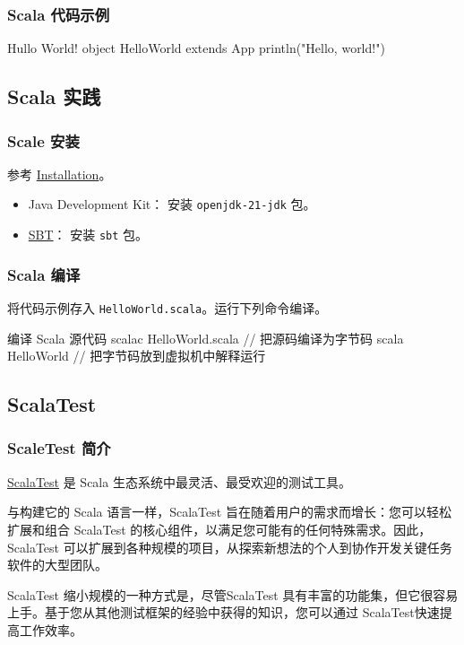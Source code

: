 \documentclass[xcolor=table,dvipsnames,svgnames,aspectratio=169]{ctexbeamer}
\begin{document}
\begin{frame}[fragile]
  \frametitle{Scala 代码示例}
  \begin{codeblock}[language=scala]{Hullo World!}
object HelloWorld extends App {
    println("Hello, world!")
  }
  \end{codeblock}
\end{frame}

\subsection{Scala 实践}

\begin{frame}
  \frametitle{Scale 安装}
  \label{scalainstall}
  参考 \href{https://www.chisel-lang.org/docs/installation}{Installation}。
  \begin{itemize}
    \item Java Development Kit： 安装 \lstinline|openjdk-21-jdk| 包。
    \item \href{https://www.scala-sbt.org/}{SBT}： 安装 \lstinline|sbt| 包。
  \end{itemize}
\end{frame}

\begin{frame}[fragile]
  \frametitle{Scala 编译}
  将代码示例存入 \verb|HelloWorld.scala|。运行下列命令编译。
  \begin{codeblock}[language=bash]{编译 Scala 源代码}
scalac HelloWorld.scala  // 把源码编译为字节码
scala HelloWorld  // 把字节码放到虚拟机中解释运行
      \end{codeblock}
\end{frame}

\subsection{ScalaTest}

\begin{frame}
  \frametitle{ScaleTest 简介}
  \href{https://www.scalatest.org/}{ScalaTest} 是 Scala 生态系统中最灵活、最受欢迎的测试工具。
  
  与构建它的 Scala 语言一样，ScalaTest 旨在随着用户的需求而增长：您可以轻松扩展和组合 ScalaTest 的核心组件，以满足您可能有的任何特殊需求。因此，ScalaTest 可以扩展到各种规模的项目，从探索新想法的个人到协作开发关键任务软件的大型团队。

  ScalaTest 缩小规模的一种方式是，尽管ScalaTest 具有丰富的功能集，但它很容易上手。基于您从其他测试框架的经验中获得的知识，您可以通过 ScalaTest快速提高工作效率。
\end{frame}
\end{document}
